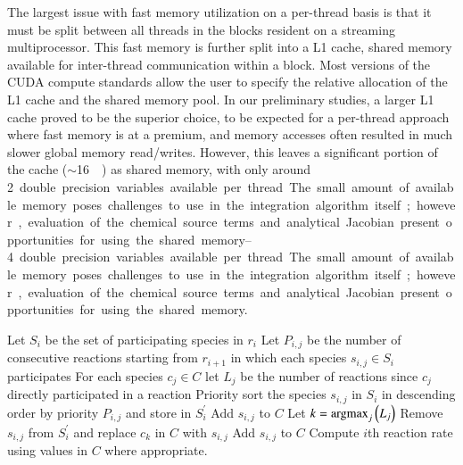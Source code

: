 \documentclass[preprint]{elsarticle}
\newcommand{\argmax}{\operatornamewithlimits{argmax}}
\begin{document}
The largest issue with fast memory utilization on a per-thread basis is that it must be split between all threads in the blocks resident on a streaming multiprocessor.
This fast memory is further split into a L1 cache, shared memory available for inter-thread communication within a block.
Most versions of the CUDA compute standards allow the user to specify the relative allocation of the L1 cache and the shared memory pool.
In our preliminary studies, a larger L1 cache proved to be the superior choice, to be expected for a per-thread approach where fast memory is at a premium, and memory accesses often resulted in much slower global memory read/writes.
However, this leaves a significant portion of the cache ($\sim$\SI{16}{\kilo\byte}) as shared memory, with only around \SIrange{2}{4} double precision variables available per thread.
The small amount of available memory poses challenges to use in the integration algorithm itself; however, evaluation of the chemical source terms and analytical Jacobian present opportunities for using the shared memory.
\begin{algorithm}[htb]
\caption{\textbf{Algorithm:} A procedure for memory caching during evaluation of reaction rates.\label{A:shared_mem_caching}}
\begin{algorithmic}[0]
    \State Let $S_i$ be the set of participating species in $r_i$
    \State Let $P_{i,j}$ be the number of consecutive reactions starting from $r_{i + 1}$ in which each species $s_{i,j} \in S_i$ participates
    \State For each species $c_j \in C$ let $L_j$ be the number of reactions since $c_j$ directly participated in a reaction
    \State Priority sort the species $s_{i,j}$ in $S_{i}$ in descending order by priority $P_{i,j}$ and store in $S_{i}^{\prime}$
		\State Add $s_{i,j}$ to $C$
	  \State Let $k = \argmax_j \left(L_j \right)$
	  \State Remove $s_{i,j}$ from $S_{i}^{\prime}$ and replace $c_k$ in $C$ with $s_{i,j}$
      \EndIf
    \EndFor
		\State Add $s_{i,j}$ to $C$
      \EndIf
    \EndFor
    \State Compute $i$th reaction rate using values in $C$ where appropriate.
  \EndFor
\end{algorithmic}
\end{algorithm}
\end{document}
